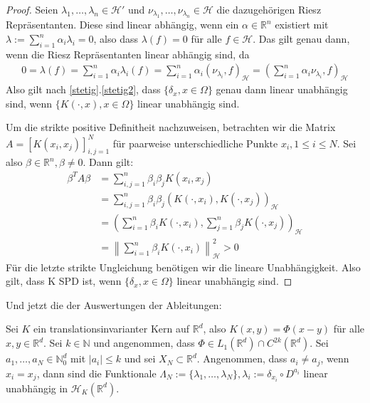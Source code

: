 \begin{proof}
Seien $\lambda_1, \dots, \lambda_n \in \mathcal{H}'$ und $\nu_{\lambda_1},\dots, \nu_{\lambda_n} \in \mathcal{H}$ die dazugehörigen Riesz Repräsentanten. Diese sind linear abhängig, wenn ein $\alpha \in \mathbb{R}^n$ existiert mit $\lambda := \sum_{i=1}^n \alpha_i \lambda_i = 0$, also dass $\lambda(f) = 0$ für alle $f \in \mathcal{H}$. Das gilt genau dann, wenn die Riesz Repräsentanten linear abhängig sind, da
\begin{align*}
0 = \lambda(f) = \sum_{i=1}^n \alpha_i \lambda_i(f) = \sum_{i=1}^n \alpha_i \left( \nu_{\lambda_i},f\right)_\mathcal{H} = \left( \sum_{i=1}^n \alpha_i \nu_{\lambda_i}, f \right)_\mathcal{H}
\end{align*}
Also gilt nach \ref{stetig}.\ref{stetig2}, dass $\{\delta_x,x\in \Omega\}$ genau dann linear unabhängig sind, wenn $\{K(\cdot,x) , x \in \Omega\}$ linear unabhängig sind.

Um die strikte positive Definitheit nachzuweisen, betrachten wir die Matrix $A=[K(x_i, x_j)]_{i,j=1}^N$ für paarweise unterschiedliche Punkte $x_i, 1 \le i \le N$. Sei also $\beta \in \mathbb{R}^n, \beta \neq 0$. Dann gilt:
\begin{align*}
\beta^T A \beta &= \sum_{i,j=1}^n \beta_i \beta_j K(x_i, x_j)\\
&= \sum_{i,j=1}^n \beta_i  \beta_j \left(K(\cdot, x_i),K(\cdot,x_j)\right)_\mathcal{H}\\
&= \left( \sum_{i=1}^n \beta_i K(\cdot,x_i),\sum_{j=1}^n \beta_j K(\cdot, x_j) \right)_\mathcal{H}\\
&= \left\| \sum_{i=1}^n \beta_i K(\cdot, x_i) \right\|_\mathcal{H}^2 > 0
\end{align*}
Für die letzte strikte Ungleichung benötigen wir die lineare Unabhängigkeit. Also gilt, dass K \ac{SPD} ist, wenn $\{\delta_x,x\in \Omega\}$ linear unabhängig sind.
\end{proof}

Und jetzt die der Auswertungen der Ableitungen:

\begin{theorem}
\label{linUn}
Sei $K$ ein translationsinvarianter Kern auf $\mathbb{R}^d$, also $K(x,y) = \Phi (x-y)$ für alle $x,y \in \mathbb{R}^d$. Sei $k \in \mathbb{N}$ und angenommen, dass $\Phi \in L_1(\mathbb{R}^d) \cap C^{2k}(\mathbb{R}^d)$. Sei $a_1, \dots, a_N \in \mathbb{N}_0^d$ mit $|a_i| \le k$ und sei $X_N \subset \mathbb{R}^d$. Angenommen, dass $a_i \neq a_j$, wenn $x_i = x_j$, dann sind die Funktionale $\Lambda_N := \{\lambda_1, \dots, \lambda_N\}, \lambda_i := \delta_{x_i} \circ D^{a_i}$ linear unabhängig in $\mathcal{H}_K(\mathbb{R}^d)$.
\end{theorem}

